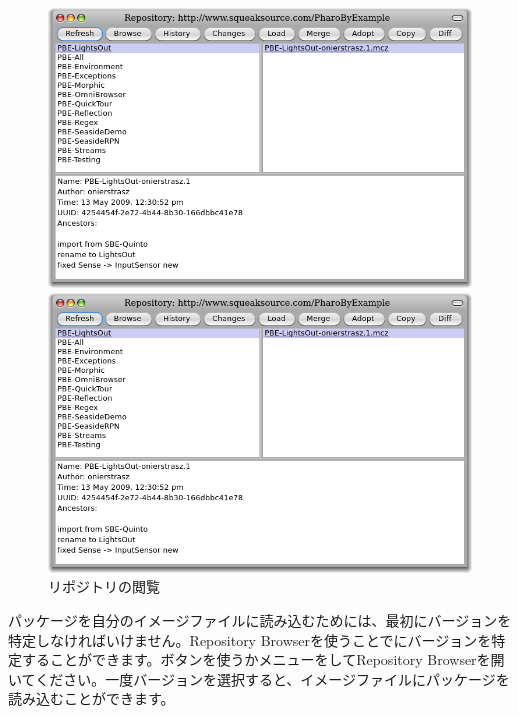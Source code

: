 \documentclass[a4paper,10pt,twoside]{book}
\begin{document}
\begin{figure}[hbt]
\ifluluelse
	{\centerline {\includegraphics[width=\textwidth]{BrowseRepository}}}
	{\centerline {\includegraphics[scale=0.7]{BrowseRepository}}}
\caption{リポジトリの閲覧
}
\end{figure}


パッケージを自分のイメージファイルに読み込むためには、最初にバージョンを特定しなければいけません。Repository Browserを使うことでにバージョンを特定することができます。ボタンを使うかメニューを\actclick してRepository Browserを開いてください。一度バージョンを選択すると、イメージファイルにパッケージを読み込むことができます。

\end{document}
